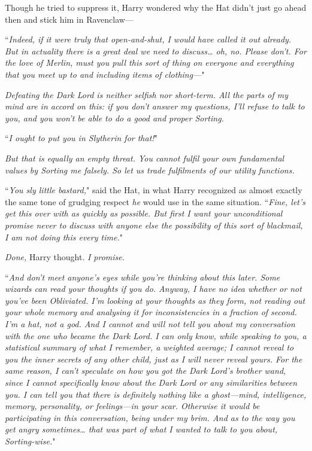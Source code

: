 Though he tried to suppress it, Harry wondered why the Hat didn't just go ahead then and stick him in Ravenclaw—

``\emph{Indeed, if it were truly that open-and-shut, I would have called it out already. But in actuality there is a great deal we need to discuss{\ldots} oh, no. Please don't. For the love of Merlin, \emph{must} you pull this sort of thing on everyone and everything that you meet up to and including items of clothing—}"

\emph{Defeating the Dark Lord is neither selfish nor short-term. All the parts of my mind are in accord on this: if you don't answer my questions, I'll refuse to talk to you, and you won't be able to do a good and proper Sorting.}

``\emph{I ought to put you in Slytherin for that!}"

\emph{But that is \emph{equally} an empty threat. You cannot fulfil your own fundamental values by Sorting me falsely. So let us trade fulfilments of our utility functions.}

``\emph{You sly little bastard,}" said the Hat, in what Harry recognized as almost exactly the same tone of grudging respect \emph{he} would use in the same situation. ``\emph{Fine, let's get this over with as quickly as possible. But first I want your unconditional promise never to discuss with anyone else the possibility of this sort of blackmail, I am \emph{not} doing this every time.}"

\emph{Done,} Harry thought. \emph{I promise.}

``\emph{And don't meet anyone's eyes while you're thinking about this later. Some wizards can read your thoughts if you do. Anyway, I have no idea whether or not you've been Obliviated. I'm looking at your thoughts as they form, not reading out your whole memory and analysing it for inconsistencies in a fraction of second. I'm a hat, not a god. And I cannot and will not tell you about my conversation with the one who became the Dark Lord. I can only \emph{know}, while speaking to you, a statistical summary of what I remember, a weighted average; I \emph{cannot} reveal to you the inner secrets of any other child, just as I will never reveal yours. For the same reason, I can't speculate on how you got the Dark Lord's brother wand, since I cannot specifically know about the Dark Lord or any similarities between you. I \emph{can} tell you that there is definitely nothing like a ghost—mind, intelligence, memory, personality, or feelings—in your scar. Otherwise it would be participating in this conversation, being under my brim. And as to the way you get angry sometimes{\ldots} that was part of what I wanted to talk to you about, Sorting-wise.}"

